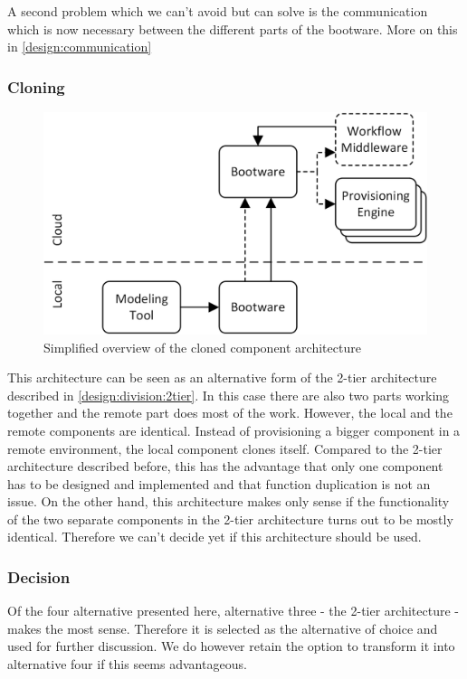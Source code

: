 A second problem which we can't avoid but can solve is the communication which is now necessary between the different parts of the bootware.
More on this in \autoref{design:communication}

\subsubsection{Cloning}

\begin{figure}[!htbp]
	\centering
	\includegraphics[resolution=600]{design/assets/simple_clone}
	\caption{Simplified overview of the cloned component architecture}
	\label{image:clone}
\end{figure}

This architecture can be seen as an alternative form of the 2-tier architecture described in \autoref{design:division:2tier}.
In this case there are also two parts working together and the remote part does most of the work.
However, the local and the remote components are identical.
Instead of provisioning a bigger component in a remote environment, the local component clones itself.
Compared to the 2-tier architecture described before, this has the advantage that only one component has to be designed and implemented and that function duplication is not an issue.
On the other hand, this architecture makes only sense if the functionality of the two separate components in the 2-tier architecture turns out to be mostly identical.
Therefore we can't decide yet if this architecture should be used.

\subsubsection{Decision}

Of the four alternative presented here, alternative three - the 2-tier architecture - makes the most sense.
Therefore it is selected as the alternative of choice and used for further discussion.
We do however retain the option to transform it into alternative four if this seems advantageous.
